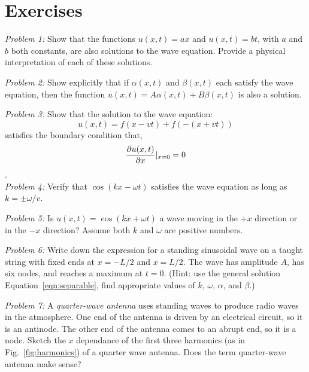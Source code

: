 \documentclass[12pt]{article}
\begin{document}
\section{Exercises}

\noindent
{\em Problem 1:} Show that the functions $u(x,t) = a x$ and $u(x,t) =
b t$, with $a$ and $b$ both constants, are also solutions to the wave equation.  Provide a physical
interpretation of each of these solutions. \\

\vskip 0.5cm

\noindent
{\em Problem 2:} Show explicitly that if $\alpha(x,t)$ and $\beta(x,t)$ each satisfy the wave equation, then the function $u(x,t) = A \alpha(x,t) + B \beta(x,t)$ is also a solution. \\

\vskip 0.5cm

\noindent
{\em Problem 3:} Show that the solution to the wave equation:
\begin{displaymath}
u(x,t) = f(x-vt)  + f(-(x+vt))
\end{displaymath}
satisfies the boundary condition that,
\begin{displaymath}
\frac{\partial u(x,t)}{\partial x} |_{x=0} = 0
\end{displaymath}. \\

\noindent
{\em Problem 4:}   Verify that $\cos(kx - \omega t)$ satisfies the wave equation as long as $k = \pm \omega / v$. \\

\vskip 0.5cm

\noindent
{\em Problem 5:}   Is $u(x,t) = \cos(kx + \omega t)$ a wave moving in the $+x$ direction or in the $-x$ direction? Assume both $k$ and $\omega$ are positive numbers. \\

\vskip 0.5cm


\noindent
{\em Problem 6:} Write down the expression for a standing sinusoidal
wave on a taught string with fixed ends at $x=-L/2$ and $x=L/2$.  The
wave has amplitude $A$, has six nodes, and reaches a maximum at $t=0$.
(Hint: use the general solution Equation~\ref{eqn:separable}, find
appropriate values of $k$, $\omega$, $\alpha$, and $\beta$.)  

\vskip 0.5cm

\noindent
{\em Problem 7:}   A {\em quarter-wave antenna} uses standing waves to produce radio waves in the atmosphere.  One end of the antenna is driven by an electrical circuit, so it is an antinode.  The other end of the antenna comes to an abrupt end, so it is a node.  Sketch the $x$ dependance of the first three harmonics (as in Fig.~\ref{fig:harmonics}) of a quarter wave antenna.  Does the term quarter-wave antenna make sense?
\end{document}
